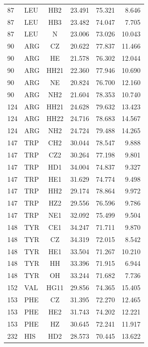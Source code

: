 \begin{table}[htbp]
{\begin{tabular}{@{}llcrrr@{}}
87   & LEU  & HB2   &  23.491 &  75.321 &   8.646 \\
87   & LEU  & HB3   &  23.482 &  74.047 &   7.705 \\
87   & LEU  & N     &  23.006 &  73.026 &  10.043 \\
90   & ARG  & CZ    &  20.622 &  77.837 &  11.466 \\
90   & ARG  & HE    &  21.578 &  76.302 &  12.044 \\
90   & ARG  & HH21  &  22.360 &  77.946 &  10.690 \\
90   & ARG  & NE    &  20.824 &  76.700 &  12.160 \\
90   & ARG  & NH2   &  21.604 &  78.353 &  10.740 \\
124  & ARG  & HH21  &  24.628 &  79.632 &  13.423 \\
124  & ARG  & HH22  &  24.716 &  78.683 &  14.567 \\
124  & ARG  & NH2   &  24.724 &  79.488 &  14.265 \\
147  & TRP  & CH2   &  30.044 &  78.547 &   9.888 \\
147  & TRP  & CZ2   &  30.264 &  77.198 &   9.801 \\
147  & TRP  & HD1   &  34.004 &  74.837 &   9.327 \\
147  & TRP  & HE1   &  31.629 &  74.774 &   9.498 \\
147  & TRP  & HH2   &  29.174 &  78.864 &   9.972 \\
147  & TRP  & HZ2   &  29.556 &  76.596 &   9.786 \\
147  & TRP  & NE1   &  32.092 &  75.499 &   9.504 \\
148  & TYR  & CE1   &  34.247 &  71.711 &   9.870 \\
148  & TYR  & CZ    &  34.319 &  72.015 &   8.542 \\
148  & TYR  & HE1   &  33.504 &  71.267 &  10.210 \\
148  & TYR  & HH    &  33.396 &  71.915 &   6.944 \\
148  & TYR  & OH    &  33.244 &  71.682 &   7.736 \\
152  & VAL  & HG11  &  29.856 &  74.365 &  15.405 \\
153  & PHE  & CZ    &  31.395 &  72.270 &  12.465 \\
153  & PHE  & HE2   &  31.743 &  74.202 &  12.221 \\
153  & PHE  & HZ    &  30.645 &  72.241 &  11.917 \\
232  & HIS  & HD2   &  28.573 &  70.445 &  13.622 \\

\end{tabular}}
\end{table}
